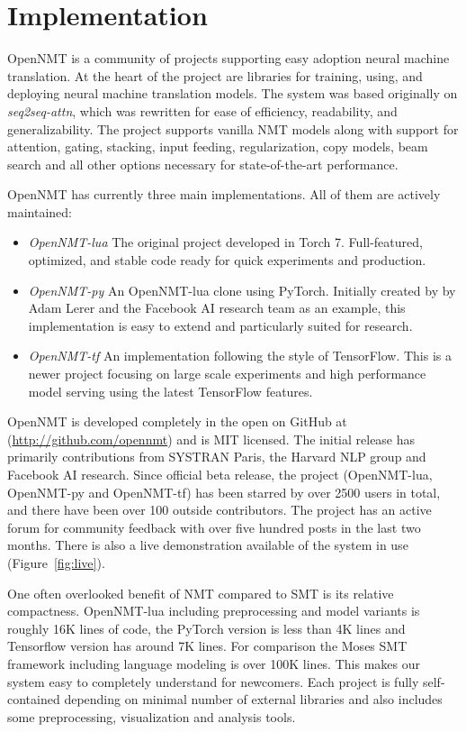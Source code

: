 \documentclass[]{article}
\begin{document}
\section{Implementation}

OpenNMT is a community of projects supporting easy adoption neural
machine translation. At the heart of the project are libraries for
training, using, and deploying neural machine translation models. The
system was based originally on \textit{seq2seq-attn}, which was rewritten for ease of efficiency, readability, and
generalizability. The project supports vanilla NMT models along with
support for attention, gating, stacking, input feeding,
regularization, copy models, beam search and all other options
necessary for state-of-the-art performance.

OpenNMT has currently three main implementations. All of them are actively maintained:

\begin{itemize}
\item \textit{OpenNMT-lua} The original project developed in Torch 7.
  Full-featured, optimized, and stable code ready for quick
  experiments and production.
  \item \textit{OpenNMT-py} An OpenNMT-lua clone using PyTorch.
    Initially created by by Adam Lerer and the Facebook AI research
    team as an example, this implementation is easy to extend and
    particularly suited for research.
  \item \textit{OpenNMT-tf} An implementation following the style of
    TensorFlow.  This is a newer project focusing on large scale
    experiments and high performance model serving using the latest
    TensorFlow features.
\end{itemize}

OpenNMT is developed completely in the open on GitHub at
(\url{http://github.com/opennmt}) and is MIT licensed.  The initial
release has primarily contributions from SYSTRAN Paris, the Harvard
NLP group and Facebook AI research. Since official beta release, the
project (OpenNMT-lua, OpenNMT-py and OpenNMT-tf) has been starred by
over 2500 users in total, and there have been over 100 outside
contributors. The project has an active forum for community feedback
with over five hundred posts in the last two months. There is also a
live demonstration available of the system in use
(Figure~\ref{fig:live}).


One often overlooked benefit of  NMT compared to SMT is its relative compactness.
OpenNMT-lua including preprocessing and model variants is roughly 16K lines of code,
the PyTorch version is less than 4K lines and Tensorflow version has around 7K lines. For comparison the Moses SMT framework
including language modeling is over 100K lines. This makes our system
easy to completely understand for newcomers. Each project is fully
self-contained depending on minimal number of external libraries
and also includes some preprocessing, visualization and analysis tools.
\end{document}
